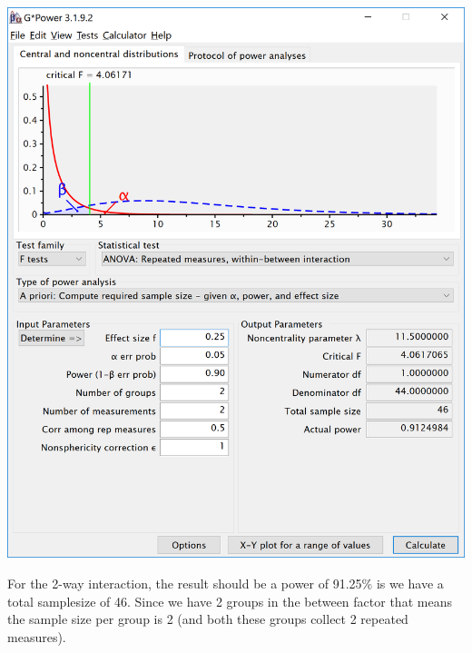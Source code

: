 \documentclass[]{book}
\begin{document}
\includegraphics{screenshots/gpower_5.png}

For the 2-way interaction, the result should be a power of 91.25\% is we have a total samplesize of 46. Since we have 2 groups in the between factor that means the sample size per group is 2 (and both these groups collect 2 repeated measures).
\end{document}
